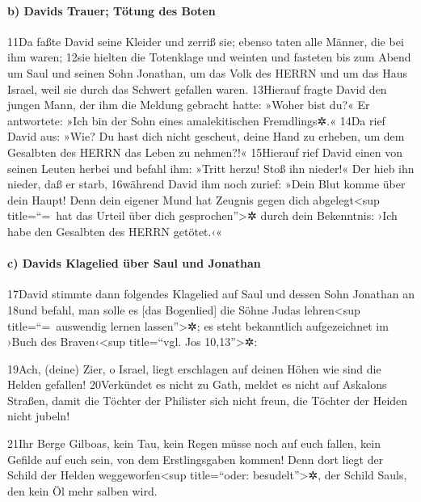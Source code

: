 \hypertarget{b-davids-trauer-tuxf6tung-des-boten}{%
\paragraph{b) Davids Trauer; Tötung des
Boten}\label{b-davids-trauer-tuxf6tung-des-boten}}

11Da faßte David seine Kleider und zerriß sie; ebenso taten alle Männer,
die bei ihm waren; 12sie hielten die Totenklage und weinten und fasteten
bis zum Abend um Saul und seinen Sohn Jonathan, um das Volk des HERRN
und um das Haus Israel, weil sie durch das Schwert gefallen waren.
13Hierauf fragte David den jungen Mann, der ihm die Meldung gebracht
hatte: »Woher bist du?« Er antwortete: »Ich bin der Sohn eines
amalekitischen Fremdlings✲.« 14Da rief David aus: »Wie? Du hast dich
nicht gescheut, deine Hand zu erheben, um dem Gesalbten des HERRN das
Leben zu nehmen?!« 15Hierauf rief David einen von seinen Leuten herbei
und befahl ihm: »Tritt herzu! Stoß ihn nieder!« Der hieb ihn nieder, daß
er starb, 16während David ihm noch zurief: »Dein Blut komme über dein
Haupt! Denn dein eigener Mund hat Zeugnis gegen dich
abgelegt\textless sup title=``=~hat das Urteil über dich
gesprochen''\textgreater✲ durch dein Bekenntnis: ›Ich habe den Gesalbten
des HERRN getötet.‹«

\hypertarget{c-davids-klagelied-uxfcber-saul-und-jonathan}{%
\paragraph{c) Davids Klagelied über Saul und
Jonathan}\label{c-davids-klagelied-uxfcber-saul-und-jonathan}}

17David stimmte dann folgendes Klagelied auf Saul und dessen Sohn
Jonathan an 18und befahl, man solle es {[}das Bogenlied{]} die Söhne
Judas lehren\textless sup title=``=~auswendig lernen
lassen''\textgreater✲; es steht bekanntlich aufgezeichnet im ›Buch des
Braven‹\textless sup title=``vgl. Jos 10,13''\textgreater✲:

19Ach, (deine) Zier, o Israel, liegt erschlagen auf deinen Höhen wie
sind die Helden gefallen! 20Verkündet es nicht zu Gath, meldet es nicht
auf Askalons Straßen, damit die Töchter der Philister sich nicht freun,
die Töchter der Heiden nicht jubeln!

21Ihr Berge Gilboas, kein Tau, kein Regen müsse noch auf euch fallen,
kein Gefilde auf euch sein, von dem Erstlingsgaben kommen! Denn dort
liegt der Schild der Helden weggeworfen\textless sup title=``oder:
besudelt''\textgreater✲, der Schild Sauls, den kein Öl mehr salben wird.

